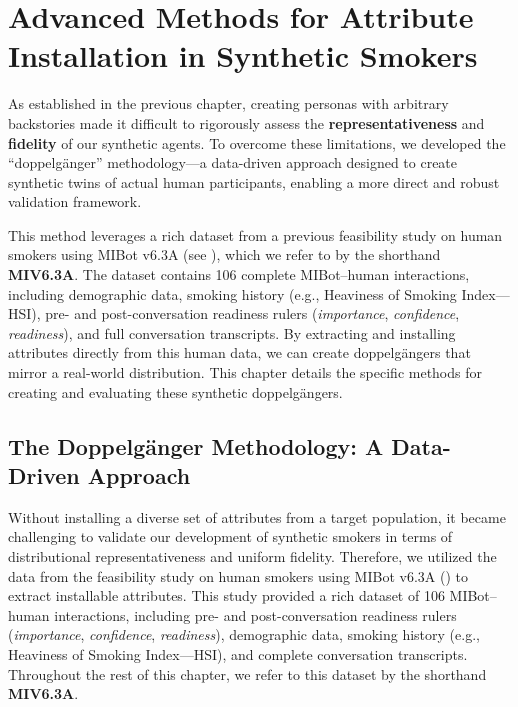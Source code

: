 \chapter{Advanced Methods for Attribute Installation in Synthetic Smokers}
\label{ch:synthetic-doppelgänger}

As established in the previous chapter, creating personas with arbitrary backstories made it difficult to rigorously assess the \textbf{representativeness} and \textbf{fidelity} of our synthetic agents. To overcome these limitations, we developed the ``doppelgänger'' methodology—a data-driven approach designed to create synthetic twins of actual human participants, enabling a more direct and robust validation framework.

This method leverages a rich dataset from a previous feasibility study on human smokers using MIBot v6.3A (see ), which we refer to by the shorthand \textbf{MIV6.3A}. The dataset contains 106 complete MIBot--human interactions, including demographic data, smoking history (e.g., Heaviness of Smoking Index---HSI), pre- and post-conversation readiness rulers (\emph{importance}, \emph{confidence}, \emph{readiness}), and full conversation transcripts. By extracting and installing attributes directly from this human data, we can create doppelgängers that mirror a real-world distribution. This chapter details the specific methods for creating and evaluating these synthetic doppelgängers.

\section{The Doppelgänger Methodology: A Data-Driven Approach}
\label{sec:synthetic-smoker-doppelgänger}


Without installing a diverse set of attributes from a target population, it became challenging to validate our development of synthetic smokers in terms of distributional representativeness and uniform fidelity. 
Therefore, we utilized the data from the feasibility study on human smokers using MIBot v6.3A () to extract installable attributes. This study provided a rich dataset of 106 MIBot--human interactions, including pre- and post-conversation readiness rulers (\emph{importance}, \emph{confidence}, \emph{readiness}), demographic data, smoking history (e.g., Heaviness of Smoking Index---HSI), and complete conversation transcripts. Throughout the rest of this chapter, we refer to this dataset by the shorthand \textbf{MIV6.3A}.

